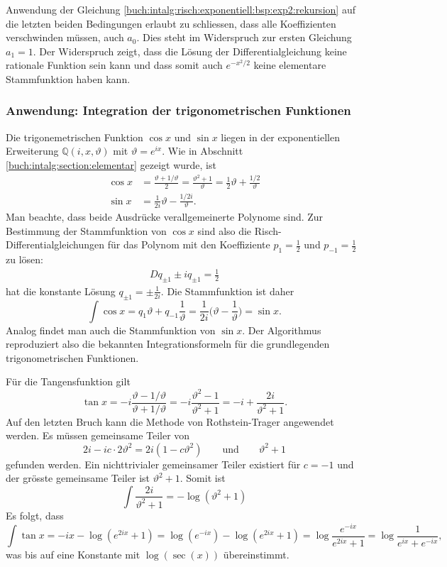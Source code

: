 \begin{beispiel}
Anwendung der Gleichung
\eqref{buch:intalg:risch:exponentiell:bsp:exp2:rekursion} auf
die letzten beiden Bedingungen erlaubt zu schliessen, dass alle
Koeffizienten verschwinden müssen, auch $a_0$.
Dies steht im Widerspruch zur ersten Gleichung $a_1=1$.
Der Widerspruch zeigt, dass die Lösung der Differentialgleichung
keine rationale Funktion sein kann und dass somit auch $e^{-x^2/2}$ keine
elementare Stammfunktion haben kann.
\end{beispiel}

%
%
\subsubsection{Anwendung: Integration der trigonometrischen Funktionen}
Die trigonemetrischen Funktion $\cos x$ und $\sin x$ liegen in der
exponentiellen Erweiterung $\mathbb{Q}(i,x,\vartheta)$ mit
$\vartheta=e^{ix}$.
Wie in Abschnitt \ref{buch:intalg:section:elementar} gezeigt wurde,
ist
\begin{align*}
\cos x
&=
\frac{\vartheta+1/\vartheta}{2}
=
\frac{\vartheta^2+ 1}{\vartheta}
=
\frac12\vartheta + \frac{1/2}{\vartheta}
\\
\sin x
&=
\frac{1}{2i}\vartheta
-
\frac{1/2i}{\vartheta}.
\end{align*}
Man beachte, dass beide Ausdrücke verallgemeinerte Polynome sind.
Zur Bestimmung der Stammfunktion von $\cos x$ sind also die
Risch-Differentialgleichungen
für das Polynom mit den Koeffiziente $p_1=\frac12$ und $p_{-1}=\frac12$
zu lösen:
\begin{align*}
Dq_{\pm 1} \pm i q_{\pm 1} = \frac12
\end{align*}
hat die konstante Lösung $q_{\pm 1} = \pm\frac{1}{2i}$.
Die Stammfunktion ist daher
\[
\int\cos x
=
q_1\vartheta + q_{-1}\frac{1}{\vartheta}
=
\frac{1}{2i}\biggl(\vartheta-\frac1{\vartheta}\biggr)
=
\sin x.
\]
Analog findet man auch die Stammfunktion von $\sin x$.
Der Algorithmus reproduziert also die bekannten Integrationsformeln für
die grundlegenden trigonometrischen Funktionen.

Für die Tangensfunktion gilt
\[
\tan x
=
-i
\frac{\vartheta-1/\vartheta}{\vartheta+1/\vartheta}
=
-i
\frac{\vartheta^2-1}{\vartheta^2+1}
=
-i
+\frac{2i}{\vartheta^2+1}.
\]
Auf den letzten Bruch kann die Methode von Rothstein-Trager angewendet
werden.
Es müssen gemeinsame Teiler von
\[
2i - ic\cdot 2\vartheta^2
=
2i(1-c\vartheta^2)
\qquad\text{und}\qquad
\vartheta^2+1
\]
gefunden werden.
Ein nichttrivialer gemeinsamer Teiler existiert für $c=-1$ und der grösste
gemeinsame Teiler ist $\vartheta^2+1$.
Somit ist
\[
\int \frac{2i}{\vartheta^2+1} = -\log(\vartheta^2+1)
\]
Es folgt, dass
\[
\int \tan x
=
-ix
-
\log(e^{2ix} + 1)
=
\log(e^{-ix})
-
\log(e^{2ix}+1)
=
\log\frac{e^{-ix}}{e^{2ix}+1}
=
\log\frac{1}{e^{ix}+e^{-ix}},
\]
was bis auf eine Konstante mit $\log(\sec(x))$ übereinstimmt.

